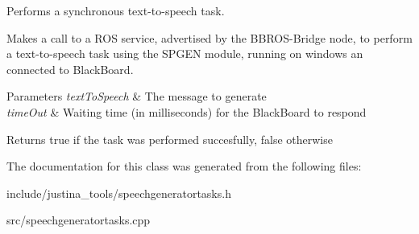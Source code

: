 Performs a synchronous text-\/to-\/speech task. 

Makes a call to a R\+OS service, advertised by the B\+B\+R\+O\+S-\/\+Bridge node, to perform a text-\/to-\/speech task using the S\+P\+G\+EN module, running on windows an connected to Black\+Board.


\begin{DoxyParams}{Parameters}
{\em text\+To\+Speech} & The message to generate \\
\hline
{\em time\+Out} & Waiting time (in milliseconds) for the Black\+Board to respond \\
\hline
\end{DoxyParams}
\begin{DoxyReturn}{Returns}
true if the task was performed succesfully, false otherwise 
\end{DoxyReturn}


The documentation for this class was generated from the following files\+:\begin{DoxyCompactItemize}
\item 
include/justina\+\_\+tools/speechgeneratortasks.\+h\item 
src/speechgeneratortasks.\+cpp\end{DoxyCompactItemize}
